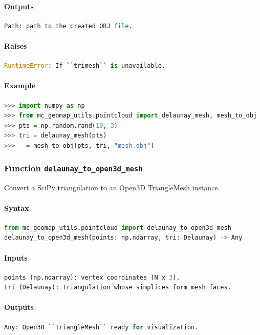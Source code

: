 \documentclass[11pt]{article}
\begin{document}
\paragraph{Outputs}
\begin{lstlisting}[language=Python]
Path: path to the created OBJ file.
\end{lstlisting}
\paragraph{Raises}
\begin{lstlisting}[language=Python]
RuntimeError: If ``trimesh`` is unavailable.
\end{lstlisting}
\paragraph{Example}
\begin{lstlisting}[language=Python]
>>> import numpy as np
>>> from mc_geomap_utils.pointcloud import delaunay_mesh, mesh_to_obj
>>> pts = np.random.rand(10, 3)
>>> tri = delaunay_mesh(pts)
>>> _ = mesh_to_obj(pts, tri, "mesh.obj")
\end{lstlisting}

\subsubsection{Function \texttt{delaunay\_to\_open3d\_mesh}}
Convert a SciPy triangulation to an Open3D TriangleMesh instance.

\paragraph{Syntax}
\begin{lstlisting}[language=Python]
from mc_geomap_utils.pointcloud import delaunay_to_open3d_mesh
delaunay_to_open3d_mesh(points: np.ndarray, tri: Delaunay) -> Any
\end{lstlisting}
\paragraph{Inputs}
\begin{lstlisting}[language=Python]
points (np.ndarray): vertex coordinates (N x 3).
tri (Delaunay): triangulation whose simplices form mesh faces.
\end{lstlisting}
\paragraph{Outputs}
\begin{lstlisting}[language=Python]
Any: Open3D ``TriangleMesh`` ready for visualization.
\end{lstlisting}
\end{document}
